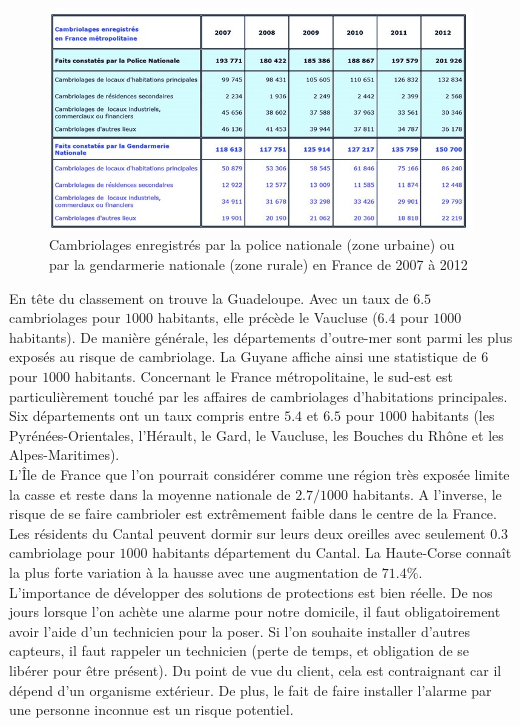 \begin{figure}[h!]
	\begin{center}
		\includegraphics[width=0.98\linewidth]{imgs/vols_france}
	\end{center}
	\caption{Cambriolages enregistrés par la police nationale (zone urbaine) ou par la gendarmerie nationale (zone rurale) en France de 2007 à 2012 \cite{www:DCpj}}
\end{figure}

En tête du classement on trouve la Guadeloupe. Avec un taux de $6.5$ cambriolages pour $1000$ habitants, elle précède le Vaucluse ($6.4$ pour $1000$ habitants). De manière générale, les départements d’outre-mer sont parmi les plus exposés au risque de cambriolage. La Guyane affiche ainsi une statistique de $6$ pour $1000$ habitants. Concernant le France métropolitaine, le sud-est est particulièrement touché par les affaires de cambriolages d’habitations principales.\\

Six départements ont un taux compris entre $5.4$ et $6.5$ pour $1000$ habitants (les Pyrénées-Orientales, l’Hérault, le Gard, le Vaucluse, les Bouches du Rhône et les Alpes-Maritimes).\\

L’Île de France que l’on pourrait considérer comme une région très exposée limite la casse et reste dans la moyenne nationale de $2.7/1000$ habitants. A l’inverse, le risque de se faire cambrioler est extrêmement faible dans le centre de la France. Les résidents du Cantal peuvent dormir sur leurs deux oreilles avec seulement $0.3$ cambriolage pour $1000$ habitants département du Cantal. La Haute-Corse connaît la plus forte variation à la hausse avec une augmentation de $71.4\%$.\\

L'importance de développer des solutions de protections est bien réelle. De nos jours lorsque l'on achète une alarme pour notre domicile, il faut obligatoirement avoir l'aide d'un technicien pour la poser. Si l'on souhaite installer d'autres capteurs, il faut rappeler un technicien (perte de temps, et obligation de se libérer pour être présent). Du point de vue du client, cela est contraignant car il dépend d'un organisme extérieur. De plus, le fait de faire installer l'alarme par une personne inconnue est un risque potentiel.\cite{www:ONDRP}\\


